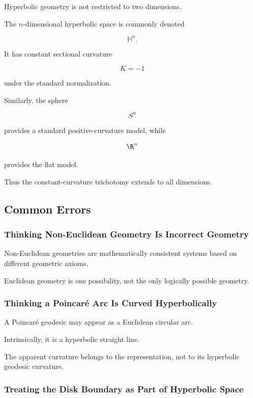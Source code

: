Hyperbolic geometry is not restricted to two dimensions.

The \(n\)-dimensional hyperbolic space is commonly denoted

\[
\boxed{\mathbb{H}^{n}.}
\]

It has constant sectional curvature

\[
K=-1
\]

under the standard normalization.

Similarly, the sphere

\[
S^n
\]

provides a standard positive-curvature model, while

\[
\R^n
\]

provides the flat model.

Thus the constant-curvature trichotomy extends to all dimensions.

\subsection{Common Errors}
\label{subsec:non-euclidean-common-errors}

\subsubsection{Thinking Non-Euclidean Geometry Is Incorrect Geometry}

Non-Euclidean geometries are mathematically consistent systems based on
different geometric axioms.

Euclidean geometry is one possibility, not the only logically possible
geometry.

\subsubsection{Thinking a Poincar\'e Arc Is Curved Hyperbolically}

A Poincar\'e geodesic may appear as a Euclidean circular arc.

Intrinsically, it is a hyperbolic straight line.

The apparent curvature belongs to the representation, not to its
hyperbolic geodesic curvature.

\subsubsection{Treating the Disk Boundary as Part of Hyperbolic Space}

